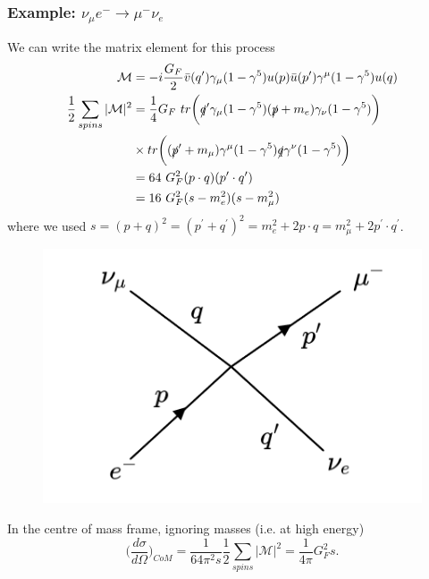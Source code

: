 \documentclass[a4paper,12pt]{article}
\begin{document}
\subsubsection{Example:  $\nu_\mu e^- \to \mu^- \nu_e$}
We can write the matrix element for this process
\newline
\begin{equation}
\begin{split}
\mathcal{M} &= -i \frac{G_F}{2} \bar{v}(q^\prime)\gamma_\mu(1-\gamma^5)u(p) \bar{u}(p^\prime)\gamma^\mu(1-\gamma^5)u(q) \\
 \frac{1}{2}\sum_{spins}|\mathcal{M}|^2 &= \frac{1}{4} G_F\ tr\bigg(\slashed{q}^\prime \gamma_\mu(1-\gamma^5)(\slashed{p}+m_e)\gamma_\nu(1-\gamma^5)\bigg) \\
 &\times tr\bigg((\slashed{p}^\prime + m_\mu)\gamma^\mu(1-\gamma^5)\slashed{q}\gamma^\nu(1-\gamma^5)\bigg)\\
 &= 64\ G_F^2(p \cdot q)(p^\prime \cdot q^\prime) \\
 &= 16\ G_F^2(s-m_e^2)(s-m_\mu^2)
\end{split}
\end{equation}
where we used $s = (p+q)^2 = (p^\prime + q^\prime)^2 = m_e^2 + 2 p \cdot q = m_\mu^2 + 2p^\prime \cdot q^\prime$. 
\begin{figure}
  \centering
  \includegraphics[width=\linewidth]{figs/diag_5.png}
\end{figure}
In the centre of mass frame, ignoring masses (i.e. at high energy)
\begin{equation}
\bigg(\frac{d\sigma}{d\Omega}\bigg)_{CoM} = \frac{1}{64\pi^2s}\frac{1}{2}\sum_{spins}|\mathcal{M}|^2 = \frac{1}{4\pi}G_F^2s.
\end{equation}
\end{document}
